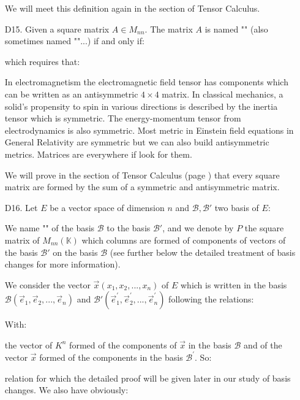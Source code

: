 \begin{enumerate}
		We will meet this definition again in the section of Tensor Calculus.
		
		\item[D15.] Given a square matrix $A \in M_{nn}$. The matrix $A$ is named "" (also sometimes named ""...) if and only if:
		
		which requires that:
		
		In electromagnetism the electromagnetic field tensor has components which can be written as an antisymmetric $4\times 4$ matrix. In classical mechanics, a solid's propensity to spin in various directions is described by the inertia tensor which is symmetric. The energy-momentum tensor from electrodynamics is also symmetric. Most metric in Einstein field equations in General Relativity are symmetric but we can also build antisymmetric metrics. Matrices are everywhere if look for them.
		\begin{tcolorbox}[title=Remark,colframe=black,arc=10pt]
		We will prove in the section of Tensor Calculus (page \pageref{decomposition square matrix symmetric and antisymmetric}) that every square matrix are formed by the sum of a symmetric and antisymmetric matrix.
		\end{tcolorbox}
		
		
		\item[D16.] Let $E$ be a vector space of dimension $n$ and $ \mathcal{B},\mathcal{B}'$ two basis of $E$:
		
		We name "" of the basis $\mathcal{B}$ to the basis  $\mathcal{B}'$, and we denote by $P$ the square matrix of $M_{nn}(\mathbb{K})$ which columns are formed of components of vectors of the basis $\mathcal{B}'$ on the basis $\mathcal{B}$ (see further below the detailed treatment of basis changes for more information).
		
		We consider the vector $\vec{x}(x_1,x_2,...,x_n)$ of $E$ which is written in the basis $\mathcal{B}(\vec{e}_1,\vec{e}_2,...,\vec{e}_n)$ and $\mathcal{B}'(\vec{e}_1^{\prime},\vec{e}_2^{\prime},...,\vec{e}_n^{\prime})$ following the relations:
		
		With:
		
		the vector of $K^n$ formed of the components of $\vec{x}$ in the basis $\mathcal{B}$ and of the vector $\vec{x}$ formed of the components in the basis $\mathcal{B}^{\prime}$. So:
		
		relation for which the detailed proof will be given later in our study of basis changes. We also have obviously:
		

\end{enumerate}
